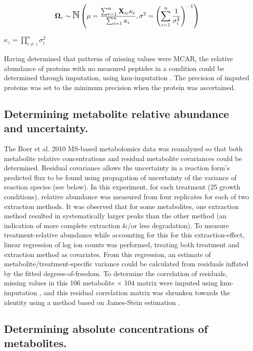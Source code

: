 \begin{align}
\boldsymbol{\Omega}_{c} \sim \mbox{\Large $\mathbb{N}$}\left(\mu = \frac{\sum_{i = 1}^{n}\textbf{X}_{ic}\kappa_{i}}{\sum_{i = 1}^{n}\kappa_{i}}, \sigma^{2} =  \left(\sum_{i = 1}^{n}\frac{1}{\sigma^{2}_{i}}\right)^{-1} \right)\label{GIL}
\end{align}

$\kappa_{z} = \prod_{i \neq z}^{n}\sigma^{2}_{i}$

Having determined that patterns of missing values were MCAR, the relative abundance of proteins with no measured peptides in a condition could be determined through imputation, using knn-imputation \cite{Troyanskaya:2001uh}.  The precision of imputed proteins was set to the minimum precision when the protein was ascertained.

\subsection*{Determining metabolite relative abundance and uncertainty.}

The Boer et al. 2010 MS-based metabolomics data \cite{Boer:2010fb} was reanalyzed so that both metabolite relative concentrations and residual metabolite covariances could be determined.  Residual covariance allows the uncertainty in a reaction form's predicted flux to be found using propagation of uncertainty of the variance of reaction species (see below).  In this experiment, for each treatment (25 growth conditions), relative abundance was measured from four replicates for each of two extraction methods.  It was observed that for some metabolites, one extraction method resulted in systematically larger peaks than the other method (an indication of more complete extraction \&/or less degradation).  To measure treatment-relative abundance while accounting for this for this extraction-effect, linear regression of log ion counts was performed, treating both treatment and extraction method as covariates.  From this regression, an estimate of metabolite/treatment-specific variance could be calculated from residuals inflated by the fitted degrees-of-freedom.  To determine the correlation of residuals, missing values in this 106 metabolite $\times$ 104 matrix were imputed using knn-imputation \cite{Troyanskaya:2001uh}, and this residual correlation matrix was shrunken towards the identity using a method based on James-Stein estimation \cite{Schaefer:2010tv}.

\subsection*{Determining absolute concentrations of metabolites.}

